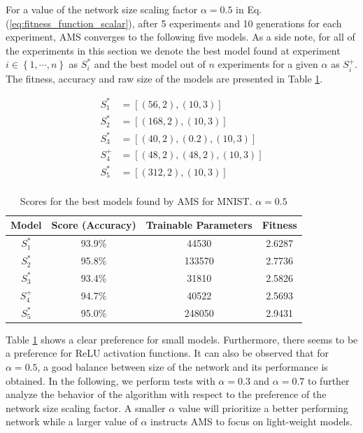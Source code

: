 \documentclass[12pt]{elsart}%
\begin{document}
For a value of the network size scaling factor $\alpha = 0.5$ in Eq. (\ref{eq:fitness_function_scalar}), after 5 experiments and 10 generations for each experiment, AMS converges to the following five models. As a side note, for all of the experiments in this section we denote the best model found at experiment $i \in \left\lbrace 1, \cdots, n \right\rbrace$ as $S_i^*$ and the best model out of $n$ experiments for a given $\alpha$ as $S_i^+$. The fitness, accuracy and raw size of the models are presented in Table \ref{table:ams_mnist_1}.

\begin{align*}
S^*_1 & = \left[ (56, 2), (10, 3) \right] \\
S^*_2 & = \left[ (168, 2), (10, 3) \right] \\
S^*_3 & = \left[ (40, 2), (0.2), (10, 3) \right] \\
S^+_4& = \left[ (48, 2), (48, 2),  (10, 3) \right] \\
S^*_5 & = \left[ (312, 2), (10, 3) \right] \\
\end{align*}



\begin{table}[!htb]
\begin{center}
\caption{Scores for the best models found by AMS for MNIST. $\alpha = 0.5$}
\label{table:ams_mnist_1}
\vspace{12pt}
\begin{tabular}{| c | c | c | c |}
\hline
Model & Score (Accuracy) & Trainable Parameters & Fitness\\
\hline
$S^*_1$ & 93.9\% & 44530 & 2.6287\\
$S^*_2$ & 95.8\% & 133570 & 2.7736\\
$S^*_3$ & 93.4\% & 31810 & 2.5826\\
$S^+_4$ & 94.7\% & 40522 & 2.5693\\
$S^*_5$ & 95.0\% & 248050 & 2.9431\\
\hline
\end{tabular}
\end{center}
\end{table}

Table \ref{table:ams_mnist_1} shows a clear preference for small models. Furthermore, there seems to be a preference for ReLU activation functions. It can also be observed that for $\alpha = 0.5$, a good balance between size of the network and its performance is obtained. In the following, we perform tests with $\alpha = 0.3$ and $\alpha = 0.7$ to further analyze the behavior of the algorithm with respect to the preference of the network size scaling factor. A smaller $\alpha$ value will prioritize a better performing network while a larger value of $\alpha$ instructs AMS to focus on light-weight models.
\end{document}
